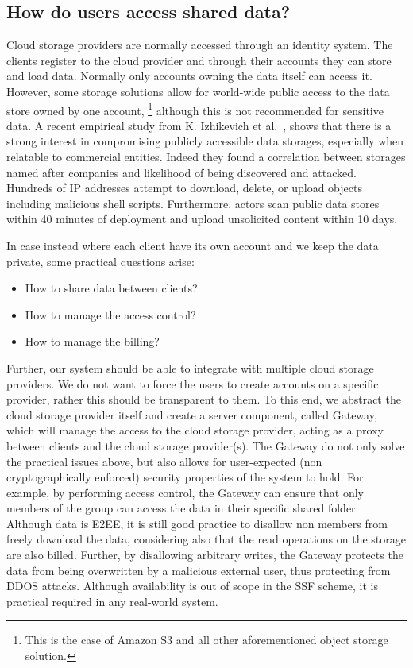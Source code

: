 \subsection{How do users access shared data?}\label{sc:cloud-storage-access-and-billing}
Cloud storage providers are normally accessed through an
identity system. The clients register to the cloud provider and
through their accounts they can store and load data.
Normally only accounts owning the data itself can access it.
However, some storage solutions allow for world-wide public access 
to the data store owned by one account,
\footnote{This is the case of Amazon S3 and all other aforementioned object storage solution.} 
although this is not recommended for sensitive data.
A recent empirical study from K. Izhikevich et al.~\cite{izhikevich2023using},
shows that there is a strong interest
in compromising publicly accessible data storages,
especially when relatable to commercial entities.
Indeed they found a correlation between storages named after companies and likelihood of being discovered and attacked.
Hundreds of IP addresses attempt to download, delete, or upload objects including malicious shell scripts. 
Furthermore, actors scan public data stores within 40 minutes of deployment and upload unsolicited content within 10 days.

In case instead where each client have its own account
and we keep the data private,
some practical questions arise:
\begin{itemize}
    \item How to share data between clients?
    \item How to manage the access control?
    \item How to manage the billing?
\end{itemize}
Further, our system should be able to integrate with multiple
cloud storage providers. We do not want to force the users to
create accounts on a specific provider, rather this should be
transparent to them.
To this end, we abstract the cloud storage provider itself
and create a server component, called Gateway, which will manage
the access to the cloud storage provider, acting as a proxy
between clients and the cloud storage provider(s).
The Gateway do not only solve the practical issues above, but also
allows for user-expected (non cryptographically enforced) 
security properties of the system to hold.
For example, by performing access control, the Gateway can ensure
that only members of the group can access the data in their
specific shared folder. Although data is E2EE, it is still
good practice to disallow non members from freely download the data,
considering also that the read operations on the storage are also billed.
Further, by disallowing arbitrary writes, the Gateway
protects the data from being overwritten by a malicious external user,
thus protecting from DDOS attacks.
Although availability is out of scope in the SSF scheme,
it is practical required in any real-world system.


